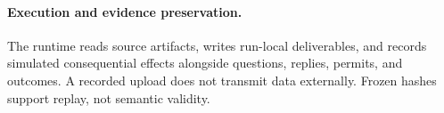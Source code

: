 \paragraph{Execution and evidence preservation.}
The runtime reads source artifacts, writes run-local deliverables, and records simulated consequential effects alongside questions, replies, permits, and outcomes. A recorded upload does not transmit data externally. Frozen hashes support replay, not semantic validity.
